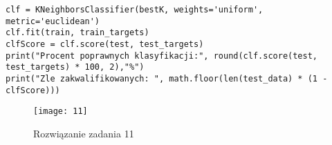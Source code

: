 \documentclass[12pt,a4paper]{article}
\begin{document}
\begin{itemize}
\begin{lstlisting}
clf = KNeighborsClassifier(bestK, weights='uniform',
metric='euclidean')
clf.fit(train, train_targets)
clfScore = clf.score(test, test_targets)
print("Procent poprawnych klasyfikacji:", round(clf.score(test, test_targets) * 100, 2),"%")
print("Zle zakwalifikowanych: ", math.floor(len(test_data) * (1 - clfScore)))
	\end{lstlisting}
		\begin{figure}[h]
                        \texttt{[image: 11]}
                        \centering
			\caption{Rozwiązanie zadania 11}
			\label{fig:fig11}
                \end{figure}
                \clearpage
        	\end{itemize}
	
\end{document}
